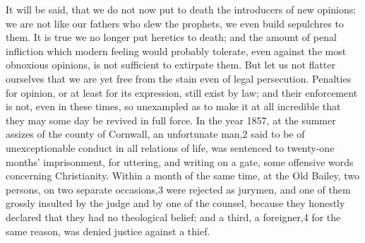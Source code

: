 \documentclass[11pt,openany]{book}
\begin{document}
It will be said, that we do not now put to death the introducers of new opinions: we are not like our fathers who slew the prophets, we even build sepulchres to them. It is true we no longer put heretics to death; and the amount of penal infliction which modern feeling would probably tolerate, even against the most obnoxious opinions, is not sufficient to extirpate them. But let us not flatter ourselves that we are yet free from the stain even of legal persecution. Penalties for opinion, or at least for its expression, still exist by law; and their enforcement is not, even in these times, so unexampled as to make it at all incredible that they may some day be revived in full force. In the year 1857, at the summer assizes of the county of Cornwall, an unfortunate man,2 said to be of unexceptionable conduct in all relations of life, was sentenced to twenty-one months' imprisonment, for uttering, and writing on a gate, some offensive words concerning Christianity. Within a month of the same time, at the Old Bailey, two persons, on two separate occasions,3 were rejected as jurymen, and one of them grossly insulted by the judge and by one of the counsel, because they honestly declared that they had no theological belief; and a third, a foreigner,4 for the same reason, was denied justice against a thief.
\end{document}
